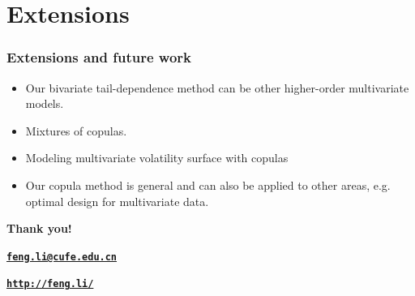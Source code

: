 \documentclass{beamer}
\begin{document}
\section{Extensions}
\begin{frame}
  \frametitle{Extensions and future work}
  \begin{itemize}
  \item Our bivariate tail-dependence method can be other higher-order multivariate models.
  \item Mixtures of copulas.
  \item Modeling multivariate volatility surface with copulas
  \item Our copula method is general and can also be applied to other areas,
    e.g. optimal design for multivariate data.

  \end{itemize}
\end{frame}



\begin{frame}[plain]
  \addtocounter{framenumber}{-1}
  \begin{center}
    {\color{SUblue} \textbf{\Huge Thank you!}}
    \vspace{1cm}

    {\texttt{\textbf{\url{feng.li@cufe.edu.cn}}}}

    \vspace{1cm}

    {\texttt{\textbf{\url{http://feng.li/}}}}

  \end{center}
\end{frame}
\end{document}
